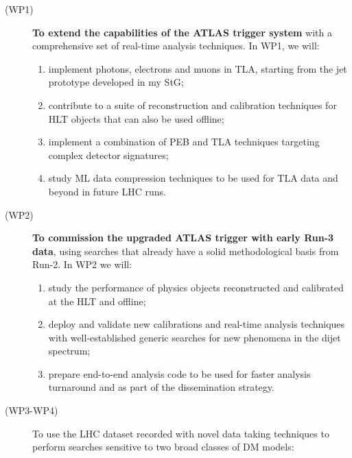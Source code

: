 \begin{description}
\item[(WP1)]  \textbf{To extend the capabilities of the ATLAS trigger system} with a comprehensive set of real-time analysis techniques. 
In WP1, we will:
\begin{enumerate} 
\item implement photons, electrons and muons in TLA, starting from the jet prototype developed in my StG;
\item contribute to a suite of reconstruction and calibration techniques for HLT objects that can also be used offline;
\item implement a combination of PEB and TLA techniques targeting complex detector signatures;
\item study ML data compression techniques to be used for TLA data and beyond in future LHC runs. 
\end{enumerate}
\item[(WP2)] \textbf{To commission the upgraded ATLAS trigger with early Run-3 data}, using searches that already have a solid methodological basis from Run-2. In WP2 we will:
\begin{enumerate} 
\item study the performance of physics objects reconstructed and calibrated at the HLT and offline; 
\item deploy and validate new calibrations and real-time analysis techniques with well-established generic searches for new phenomena in the dijet spectrum;
\item prepare end-to-end analysis code to be used for faster analysis turnaround and as part of the dissemination strategy.  
\end{enumerate} 

\item[(WP3-WP4)] To use the LHC dataset recorded with novel data taking techniques to perform searches sensitive to two broad classes of DM models:
 

\end{description}

